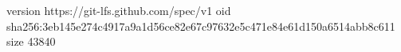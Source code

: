 version https://git-lfs.github.com/spec/v1
oid sha256:3eb145e274c4917a9a1d56ce82e67c97632e5c471e84e61d150a6514abb8c611
size 43840
